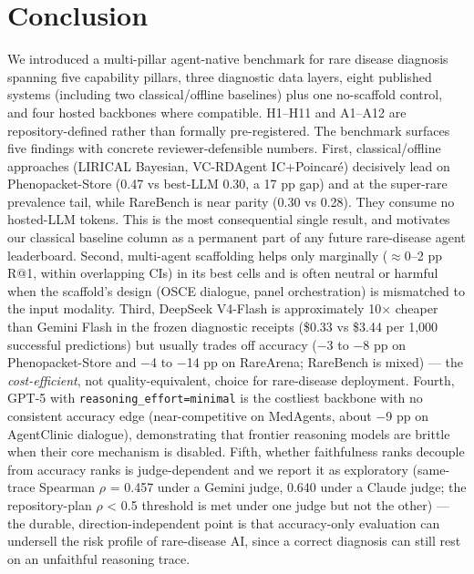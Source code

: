 \section{Conclusion}\label{sec-10}

We introduced a multi-pillar agent-native benchmark for rare disease
diagnosis spanning five capability pillars, three diagnostic data layers,
eight published systems (including two classical/offline baselines) plus one
no-scaffold control, and four hosted backbones where compatible. H1--H11 and A1--A12
are repository-defined rather than formally pre-registered. The benchmark surfaces five
findings with concrete reviewer-defensible numbers. First,
classical/offline approaches (LIRICAL Bayesian, VC-RDAgent IC+Poincar\'e)
decisively lead on Phenopacket-Store (0.47 vs best-LLM 0.30, a 17 pp
gap) and at the super-rare prevalence tail, while RareBench is near parity
(0.30 vs 0.28). They consume no hosted-LLM tokens. This is the most consequential single
result, and motivates our classical baseline column as a permanent
part of any future rare-disease agent leaderboard. Second,
multi-agent scaffolding helps only marginally (\ensuremath{\approx}0--2 pp R@1, within
overlapping CIs) in its best cells and is often neutral or harmful when the
scaffold's design (OSCE dialogue, panel orchestration) is mismatched to the
input modality. Third, DeepSeek V4-Flash is approximately 10\ensuremath{\times} cheaper
than Gemini Flash in the frozen diagnostic receipts (\$0.33 vs \$3.44 per
1,000 successful predictions) but usually trades off accuracy (\ensuremath{-}3 to \ensuremath{-}8 pp on Phenopacket-Store
and \ensuremath{-}4 to \ensuremath{-}14 pp on RareArena; RareBench is mixed) ---
the \emph{cost-efficient}, not quality-equivalent, choice for rare-disease
deployment. Fourth, GPT-5 with \texttt{reasoning\_effort=minimal} is the
costliest backbone with no consistent accuracy edge (near-competitive on
MedAgents, about \ensuremath{-}9 pp on AgentClinic dialogue), demonstrating that frontier reasoning
models are brittle when their core mechanism is disabled. Fifth, whether
faithfulness ranks decouple from accuracy ranks is judge-dependent and we report it as exploratory (same-trace Spearman \ensuremath{\rho} = 0.457 under a Gemini judge,
0.640 under a Claude judge; the repository-plan \ensuremath{\rho} \textless{} 0.5 threshold is met under one
judge but not the other) --- the durable, direction-independent point is that
accuracy-only evaluation can undersell the risk profile of rare-disease AI, since
a correct diagnosis can still rest on an unfaithful reasoning trace.

